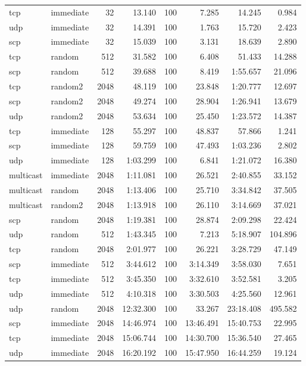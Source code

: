 \begin{tabular}{|l|l|r|r|r|r|r|r|}
tcp & immediate & 32 &  13.140 & 100 & 7.285 & 14.245 & 0.984\\
udp & immediate & 32 &  14.391 & 100 & 1.763 & 15.720 & 2.423\\
scp & immediate & 32 &  15.039 & 100 & 3.131 & 18.639 & 2.890\\
tcp & random & 512 &  31.582 & 100 & 6.408 & 51.433 & 14.288\\
scp & random & 512 &  39.688 & 100 & 8.419 & 1:55.657 & 21.096\\
tcp & random2 & 2048 &  48.119 & 100 & 23.848 & 1:20.777 & 12.697\\
scp & random2 & 2048 &  49.274 & 100 & 28.904 & 1:26.941 & 13.679\\
udp & random2 & 2048 &  53.634 & 100 & 25.450 & 1:23.572 & 14.387\\
tcp & immediate & 128 &  55.297 & 100 & 48.837 & 57.866 & 1.241\\
scp & immediate & 128 &  59.759 & 100 & 47.493 & 1:03.236 & 2.802\\
udp & immediate & 128 &  1:03.299 & 100 & 6.841 & 1:21.072 & 16.380\\
multicast & immediate & 2048 &  1:11.081 & 100 & 26.521 & 2:40.855 & 33.152\\
multicast & random & 2048 &  1:13.406 & 100 & 25.710 & 3:34.842 & 37.505\\
multicast & random2 & 2048 &  1:13.918 & 100 & 26.110 & 3:14.669 & 37.021\\
scp & random & 2048 &  1:19.381 & 100 & 28.874 & 2:09.298 & 22.424\\
udp & random & 512 &  1:43.345 & 100 & 7.213 & 5:18.907 & 104.896\\
tcp & random & 2048 &  2:01.977 & 100 & 26.221 & 3:28.729 & 47.149\\
scp & immediate & 512 &  3:44.612 & 100 & 3:14.349 & 3:58.030 & 7.651\\
tcp & immediate & 512 &  3:45.350 & 100 & 3:32.610 & 3:52.581 & 3.205\\
udp & immediate & 512 &  4:10.318 & 100 & 3:30.503 & 4:25.560 & 12.961\\
udp & random & 2048 &  12:32.300 & 100 & 33.267 & 23:18.408 & 495.582\\
scp & immediate & 2048 &  14:46.974 & 100 & 13:46.491 & 15:40.753 & 22.995\\
tcp & immediate & 2048 &  15:06.744 & 100 & 14:30.700 & 15:36.540 & 27.465\\
udp & immediate & 2048 &  16:20.192 & 100 & 15:47.950 & 16:44.259 & 19.124\\
\hline
\end{tabular}
